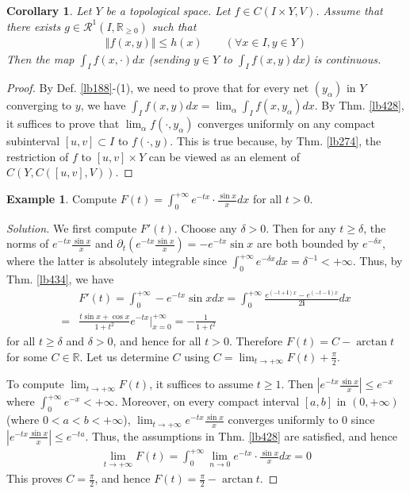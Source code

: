 \documentclass[12pt,b5paper,notitlepage]{article}
\theoremstyle{definition}
\newtheorem{eg}[df]{Example}
\theoremstyle{plain}
\newtheorem{co}[df]{Corollary}
\newcommand{\scr}{\mathscr}
\newcommand{\im}{\mathbf{i}}
\newcommand{\Rbb}{\mathbb R}
\newcommand{\dps}{\displaystyle}
\numberwithin{equation}{section}
\begin{document}
\begin{co}\label{lb429}
Let $Y$ be a topological space. Let $f\in C(I\times Y,V)$. Assume that there exists $g\in\scr R^1(I,\Rbb_{\geq0})$ such that
\begin{align}
\Vert f(x,y)\Vert\leq h(x)\qquad (\forall x\in I,y\in Y)
\end{align}
Then the map $\int_If(x,\cdot)dx$ (sending $y\in Y$ to $\int_If(x,y)dx$) is continuous.
\end{co}

\begin{proof}
By Def. \ref{lb188}-(1), we need to prove that for every net $(y_\alpha)$ in $Y$ converging to $y$, we have $\int_If(x,y)dx=\lim_\alpha\int_If(x,y_\alpha)dx$. By Thm. \ref{lb428}, it suffices to prove that $\lim_\alpha f(\cdot,y_\alpha)$ converges uniformly  on any compact subinterval $[u,v]\subset I$ to $f(\cdot,y)$. This is true because, by Thm. \ref{lb274}, the restriction of $f$ to $[u,v]\times Y$ can be viewed as an element of $C(Y,C([u,v],V))$.
\end{proof}


\begin{eg}
Compute $\dps F(t)=\int_0^{+\infty}e^{-tx}\cdot \frac{\sin x}xdx$ for all $t>0$.
\end{eg}

\begin{proof}[Solution]
We first compute $F'(t)$. Choose any $\delta>0$. Then for any $t\geq\delta$, the norms of $e^{-tx}\frac{\sin x}x$ and $\partial_t(e^{-tx}\frac{\sin x}x)=-e^{-tx}\sin x$ are both bounded by $e^{-\delta x}$, where the latter is absolutely integrable since $\int_0^{+\infty}e^{-\delta x}dx=\delta^{-1}<+\infty$. Thus, by Thm. \ref{lb434}, we have
\begin{align*}
&F'(t)=\int_0^{+\infty}-e^{-tx}\sin xdx=\int_0^{+\infty}\frac{e^{(-t+\im)x}-e^{(-t-\im)x}}{2\im}dx\\
=&\frac{t\sin x+\cos x}{1+t^2}e^{-tx}\Big|_{x=0}^{+\infty}=-\frac 1{1+t^2}
\end{align*} 
for all $t\geq\delta$ and $\delta>0$, and hence for all $t>0$. Therefore $F(t)=C-\arctan t$ for some $C\in\Rbb$. Let us determine $C$ using $C=\lim_{t\rightarrow+\infty}F(t)+\frac\pi2$. 

To compute $\lim_{t\rightarrow+\infty}F(t)$, it suffices to assume $t\geq1$. Then $|e^{-tx}\frac{\sin x}x|\leq e^{-x}$ where $\int_0^{+\infty} e^{-x}<+\infty$. Moreover, on every compact interval $[a,b]$ in $(0,+\infty)$ (where $0<a<b<+\infty$), $\lim_{t\rightarrow+\infty}e^{-tx}\frac{\sin x}x$ converges uniformly to $0$ since $|e^{-tx}\frac{\sin x}x|\leq e^{-ta}$. Thus, the assumptions in Thm. \ref{lb428} are satisfied, and hence
\begin{align*}
\lim_{t\rightarrow+\infty}F(t)=\int_0^{+\infty} \lim_{n\rightarrow 0}e^{-tx}\cdot \frac{\sin x}xdx=0
\end{align*}
This proves $C=\frac\pi 2$, and hence $F(t)=\frac\pi 2-\arctan t$.
\end{proof}
\end{document}
